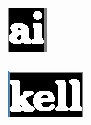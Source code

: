 \documentclass[english, paper=a4]{scrartcl}
\begin{document}
\begin{figure}[b!]
	\centering
	\begin{subfigure}[t!]{0.2\textwidth}
		\includegraphics[width=\textwidth]{mergedChars1.png}
		\label{fig:ex2a}
	\end{subfigure}
	\begin{subfigure}[t!]{0.30\textwidth}
		\includegraphics[width=\textwidth]{mergedChars2.png}
		\label{fig:ex2b}
	\end{subfigure}

\end{figure}
\end{document}

